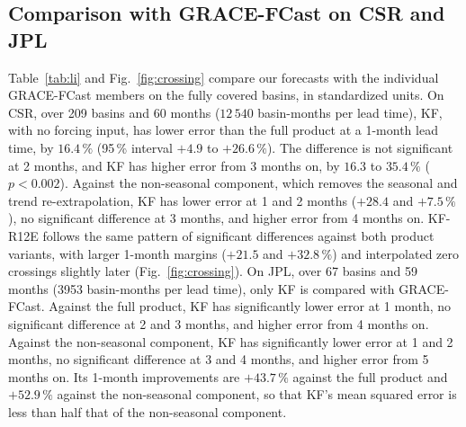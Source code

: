\documentclass[hess, manuscript]{copernicus}
\begin{document}
\subsection{Comparison with GRACE-FCast on CSR and JPL}
\label{sec:results-li}

Table~\ref{tab:li} and Fig.~\ref{fig:crossing} compare our forecasts with
the individual GRACE-FCast members on the fully covered basins, in
standardized units. On CSR, over 209 basins and 60
months
($12\,540$ basin-months per lead time), KF, with no forcing input, has
lower error than the full product at a 1-month lead time, by
$16.4\,\%$ (95\,\% interval $+4.9$ to $+26.6\,\%$). The difference is
not significant at 2 months, and KF has higher error from 3 months on, by $16.3$ to $35.4\,\%$
($p < 0.002$). Against the non-seasonal component, which removes the
seasonal and trend re-extrapolation, KF has lower error at 1 and 2 months
($+28.4$ and $+7.5\,\%$), no significant difference at 3 months, and higher
error from 4 months on. KF-R12E follows the same pattern of significant
differences against both product variants, with larger
1-month margins
($+21.5$ and $+32.8\,\%$) and interpolated zero crossings slightly later
(Fig.~\ref{fig:crossing}). On JPL, over 67 basins and 59 months
(3953 basin-months per lead time), only KF is compared with
GRACE-FCast. Against the full
product, KF has significantly lower error at 1 month, no significant
difference at 2 and 3 months, and higher error from 4 months on. Against
the non-seasonal component, KF has significantly lower error at 1 and 2
months, no significant difference at 3 and 4 months, and higher error from
5 months on. Its 1-month improvements are
$+43.7\,\%$ against the full product and $+52.9\,\%$ against the
non-seasonal component, so that KF's mean squared error is less than
half that of the non-seasonal component.
\end{document}
